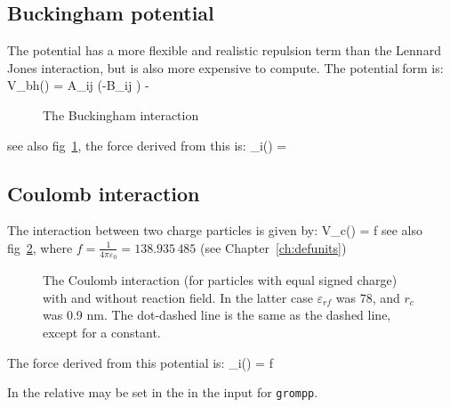 \subsection{Buckingham potential}
The  
potential has a more flexible and realistic repulsion term
than the Lennard Jones interaction, but is also more expensive to
compute. The potential form is:
\beq
V_{bh}(\rij) = A_{ij} \exp(-B_{ij} \rij) -
\eeq
\begin{figure}
\centerline{}
\caption {The Buckingham interaction}
\label{fig:bham}
\end{figure}

see also fig~\ref{fig:bham}, the force derived from this is:
\beq
 _i(\rij) =  \rnorm
\eeq

\subsection{Coulomb interaction}
\label{sec:coul}
\newcommand{\epsr}{\varepsilon_r}
\newcommand{\epsrf}{\varepsilon_{rf}}
The  interaction between two charge particles is given by:
\beq
V_c(\rij) = f \frac{q_i q_j}{\epsr \rij}
\label{eqn:vcoul}
\eeq
see also fig~\ref{fig:coul}, where $f = \frac{1}{4\pi \varepsilon_0} =
138.935\,485$ (see Chapter~\ref{ch:defunits})

\begin{figure}
\centerline{}
\caption[The Coulomb interaction (for particles with equal signed
charge) with and without reaction field.]{The Coulomb interaction (for
particles with equal signed charge) with and without reaction
field. In the latter case $\epsrf$ was 78, and $r_c$ was 0.9 nm. The
dot-dashed line is the same as the dashed line, except for a
constant.}
\label{fig:coul}
\end{figure}

The force derived from this potential is:
\beq
{}_i(\rvij) = f \frac{q_i q_j}{\epsr\rij^2}\rnorm
\eeq

In {\gromacs} the  relative  
\normindex{$\epsr$}
may be set in the in the input for {\tt grompp}. 

